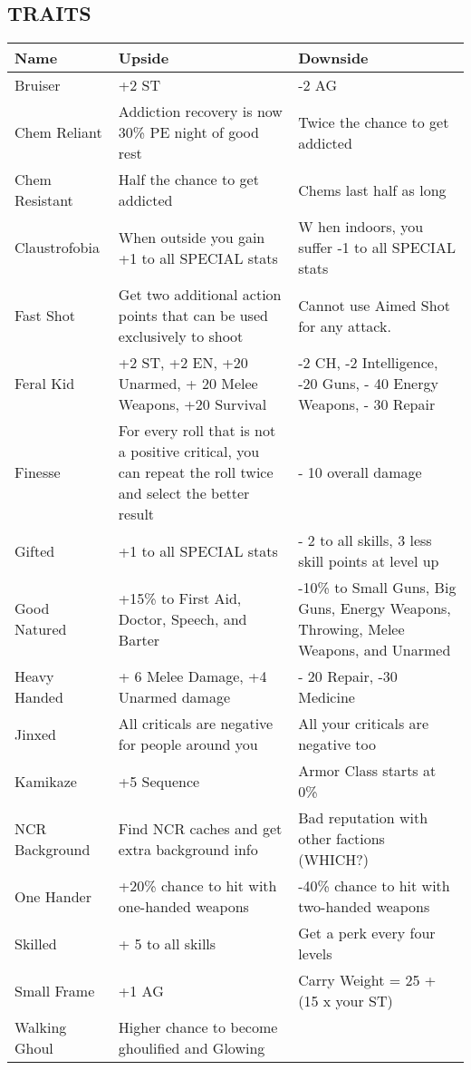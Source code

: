 
\subsection{TRAITS}
\begin{longtable}{|p{3.4cm}|p{6.5cm}|p{6.5cm}|}
\hline
\bfseries Name & \bfseries Upside & \bfseries Downside \\
\hline
\endhead

Bruiser & +2 ST & -2 AG \\
Chem Reliant & Addiction recovery is now 30\% PE night of good rest & Twice the chance to get addicted \\
Chem Resistant & Half the chance to get addicted & Chems last half as long \\
Claustrofobia & When outside you gain +1 to all SPECIAL stats & W hen indoors, you suffer -1 to all SPECIAL stats \\
Fast Shot & Get two additional action points that can be used exclusively to shoot & Cannot use Aimed Shot for any attack. \\
Feral Kid & +2 ST, +2 EN, +20 Unarmed, + 20 Melee Weapons, +20 Survival & -2 CH, -2 Intelligence, -20 Guns, - 40 Energy Weapons, - 30 Repair \\
Finesse & For every roll that is not a positive critical, you can repeat the roll twice and select the better result & - 10 overall damage \\
Gifted & +1 to all SPECIAL stats & - 2 to all skills, 3 less skill points at level up \\
Good Natured & +15\% to First Aid, Doctor, Speech, and Barter & -10\% to Small Guns, Big Guns, Energy Weapons, Throwing, Melee Weapons, and Unarmed \\
Heavy Handed & + 6 Melee Damage, +4 Unarmed damage & - 20 Repair, -30 Medicine \\
Jinxed & All criticals are negative for people around you & All your criticals are negative too \\
Kamikaze & +5 Sequence & Armor Class starts at 0\% \\
NCR Background & Find NCR caches and get extra background info & Bad reputation with other factions (WHICH?) \\
One Hander & +20\% chance to hit with one-handed weapons & -40\% chance to hit with two-handed weapons \\
Skilled & + 5 to all skills & Get a perk every four levels \\
Small Frame & +1 AG & Carry Weight = 25 + (15 x your ST) \\
Walking Ghoul & Higher chance to become ghoulified and Glowing & \\
\hline
\end{longtable}
